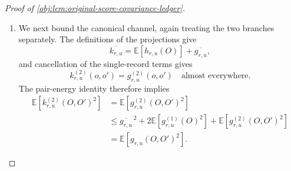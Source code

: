 \begin{proof}[Proof of \cref{obj:lem:original-score-covariance-ledger}]
\begin{enumerate}
Substitution into the conditional pair formula gives the outcome-coefficient envelope
\[
\left|
\mathbb E[\mathscr P_{0,u}[D_j,T_j](o,O')]
\right|
\le
\frac12|f_u(X(o))|
\left(d_j+a_j|\mathfrak m_{0,T_j}(o)|\right).
\]
Since
\[
\frac14(d_j+a_j|\mathfrak m_{0,T_j}|)^2
\le
\frac12(d_j^2+a_j^2\mathfrak m_{0,T_j}^2),
\]
conditioning on \(X\) gives
\[
\mathbb E\!\left[
\left\{
\mathbb E[\mathscr P_{0,u}[D_j,T_j](O,O')\mid O]
\right\}^{\!2}
\right]
\le
\frac12(d_j^2+a_j^2V_j)\|u\|_2^2.
\]
For the treatment coefficient,
\(\overline{\mathfrak m}_{1,T_j}=e_P\) and
\(|\mathfrak m_{1,T_j}|\le1\), so
\[
\left|
\mathbb E[\mathscr P_{1,u}[D_j,T_j](o,O')]
\right|
\le a_j|f_u(X(o))|.
\]
Applying the same square-envelope inequality with constant term \(2a_j\) and zero mark term yields
\[
\mathbb E\!\left[
\left\{
\mathbb E[\mathscr P_{1,u}[D_j,T_j](O,O')\mid O]
\right\}^{\!2}
\right]
\le2a_j^2\|u\|_2^2.
\]
All \(a_j,d_j\) are nonnegative and \(V_j\ge1\). The two coefficient estimates fit the common bound because
\[
\frac12(d_j^2+a_j^2V_j)
\le\{2(d_j+a_j\sqrt{V_j})\}^2,
\qquad
2a_j^2
\le\{2(d_j+a_j\sqrt{V_j})\}^2.
\]
Define the nonnegative increment sum and conditional-pair budget by
\[
\mathcal S_{\mathrm{inc}}
=
\sum_{j=1}^{L}(d_j+a_j\sqrt{V_j}),
\qquad
B_{g,\mathrm{multi}}
=
\sqrt{V_0}+2\mathcal S_{\mathrm{inc}}.
\]
The initial projection estimate at rank \(M\), followed by the triangle inequality for the finite increment sum in \(L_2(P)\), gives
\[
\begin{aligned}
\left\|
\mathbb E[g_{r,u}(O,O')\mid O]
\right\|_{L_2(P)}
&\le
\sqrt{V_0}\|u\|_2
+
\sum_{j=1}^{L}2(d_j+a_j\sqrt{V_j})\|u\|_2\\
&=
B_{g,\mathrm{multi}}\|u\|_2.
\end{aligned}
\]
This includes \(L=0\), when the sum is zero. The singleton estimate for the augmented kernel now gives
\[
\begin{aligned}
4\operatorname{Var}_P(k_{r,u}^{(1)})
&\le
(B_h+2B_{g,\mathrm{multi}})^2\|u\|_2^2\\
&=
(4\sqrt{V_0}+4\mathcal S_{\mathrm{inc}})^2\|u\|_2^2\\
&\le
(16\sqrt{V_0}+8\mathcal S_{\mathrm{inc}})^2\|u\|_2^2
=
L_1^2\|u\|_2^2.
\end{aligned}
\]

\item We next bound the canonical channel, again treating the two branches separately. The definitions of the projections give
\[
\overline{k_{r,u}}
=
\mathbb E[h_{r,u}(O)]+\overline{g_{r,u}},
\]
and cancellation of the single-record terms gives
\[
k_{r,u}^{(2)}(o,o')=g_{r,u}^{(2)}(o,o')
\quad\text{almost everywhere}.
\]
The pair-energy identity therefore implies
\[
\begin{aligned}
\mathbb E[k_{r,u}^{(2)}(O,O')^2]
&=
\mathbb E[g_{r,u}^{(2)}(O,O')^2]\\
&\le
\overline{g_{r,u}}^{\,2}
+
2\mathbb E[g_{r,u}^{(1)}(O)^2]
+
\mathbb E[g_{r,u}^{(2)}(O,O')^2]\\
&=
\mathbb E[g_{r,u}(O,O')^2].
\end{aligned}
\]


\end{enumerate}
\end{proof}
